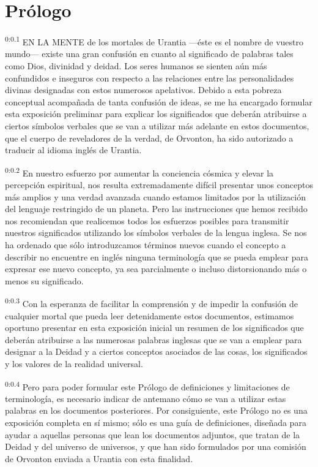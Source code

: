 \chapter{Prólogo}
\par
\textsuperscript{0:0.1} EN LA MENTE de los mortales de Urantia ---éste es el nombre de vuestro mundo--- existe una gran confusión en cuanto al significado de palabras tales como Dios, divinidad y deidad. Los seres humanos se sienten aún más confundidos e inseguros con respecto a las relaciones entre las personalidades divinas designadas con estos numerosos apelativos. Debido a esta pobreza conceptual acompañada de tanta confusión de ideas, se me ha encargado formular esta exposición preliminar para explicar los significados que deberán atribuirse a ciertos símbolos verbales que se van a utilizar más adelante en estos documentos, que el cuerpo de reveladores de la verdad, de Orvonton, ha sido autorizado a traducir al idioma inglés de Urantia.

\par
\textsuperscript{0:0.2} En nuestro esfuerzo por aumentar la conciencia cósmica y elevar la percepción espiritual, nos resulta extremadamente difícil presentar unos conceptos más amplios y una verdad avanzada cuando estamos limitados por la utilización del lenguaje restringido de un planeta. Pero las instrucciones que hemos recibido nos recomiendan que realicemos todos los esfuerzos posibles para transmitir nuestros significados utilizando los símbolos verbales de la lengua inglesa. Se nos ha ordenado que sólo introduzcamos términos nuevos cuando el concepto a describir no encuentre en inglés ninguna terminología que se pueda emplear para expresar ese nuevo concepto, ya sea parcialmente o incluso distorsionando más o menos su significado.

\par
\textsuperscript{0:0.3} Con la esperanza de facilitar la comprensión y de impedir la confusión de cualquier mortal que pueda leer detenidamente estos documentos, estimamos oportuno presentar en esta exposición inicial un resumen de los significados que deberán atribuirse a las numerosas palabras inglesas que se van a emplear para designar a la Deidad y a ciertos conceptos asociados de las cosas, los significados y los valores de la realidad universal.

\par
\textsuperscript{0:0.4} Pero para poder formular este Prólogo de definiciones y limitaciones de terminología, es necesario indicar de antemano cómo se van a utilizar estas palabras en los documentos posteriores. Por consiguiente, este Prólogo no es una exposición completa en sí mismo; sólo es una guía de definiciones, diseñada para ayudar a aquellas personas que lean los documentos adjuntos, que tratan de la Deidad y del universo de universos, y que han sido formulados por una comisión de Orvonton enviada a Urantia con esta finalidad.

